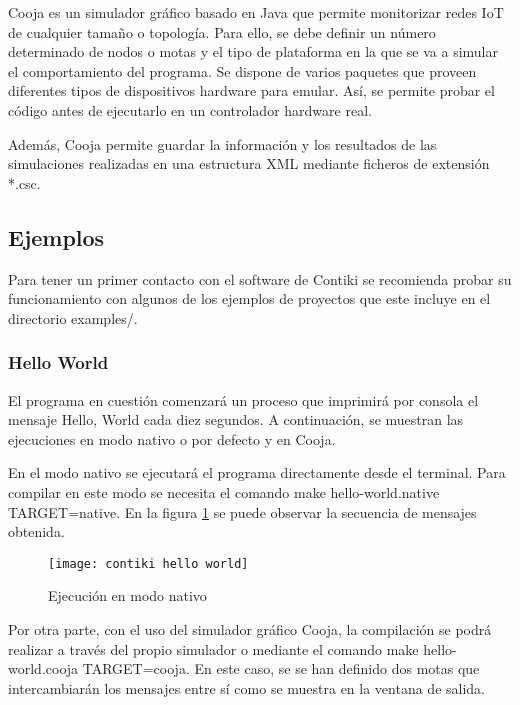 Cooja es un simulador gráfico basado en Java que permite monitorizar redes IoT de cualquier tamaño o topología. Para ello, se debe definir un número determinado de nodos o motas y el tipo de plataforma en la que se va a simular el comportamiento del programa. Se dispone de varios paquetes que proveen diferentes tipos de dispositivos hardware para emular. Así, se permite probar el código antes de ejecutarlo en un controlador hardware real.

Además, Cooja permite guardar la información y los resultados de las simulaciones realizadas en una estructura XML mediante ficheros de extensión *.csc.


\subsection{Ejemplos}
Para tener un primer contacto con el software de Contiki se recomienda probar su funcionamiento con algunos de los ejemplos de proyectos que este incluye en el directorio examples/.

\subsubsection{Hello World}
El programa en cuestión comenzará un proceso que imprimirá por consola el mensaje Hello, World cada diez segundos. A continuación, se muestran las ejecuciones en modo nativo o por defecto y en Cooja.

En el modo nativo se ejecutará el programa directamente desde el terminal. Para compilar en este modo se necesita el comando make hello-world.native TARGET=native. En la figura \ref{fig:contiki hello world} se puede observar la secuencia de mensajes obtenida.


\begin{figure}[h!]
    \centering
    \texttt{[image: contiki hello world]}
    \caption{Ejecución en modo nativo}
    \label{fig:contiki hello world}
\end{figure}

Por otra parte, con el uso del simulador gráfico Cooja, la compilación se podrá realizar a través del propio simulador o mediante el comando make hello-world.cooja TARGET=cooja. En este caso, se se han definido dos motas que intercambiarán los mensajes entre sí como se muestra en la ventana de salida.


